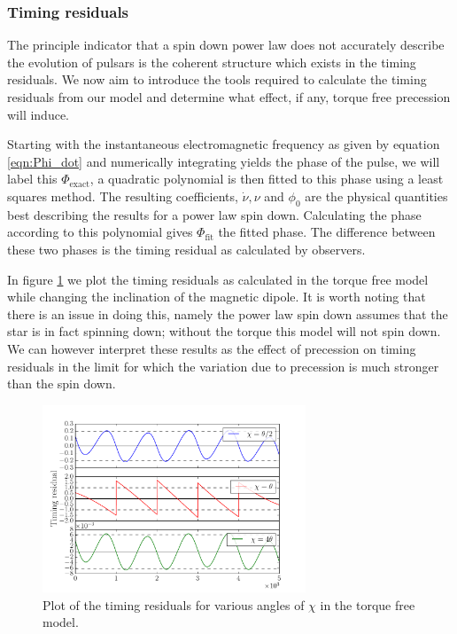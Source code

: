 \documentclass[11pt]{article}
\numberwithin{equation}{section}
\numberwithin{figure}{section}
\numberwithin{table}{section}
\begin{document}
\subsubsection{Timing residuals}
The principle indicator that a spin down power law does not accurately describe the evolution of pulsars is the coherent structure which exists in the timing residuals. We now aim to introduce the tools required to calculate the timing residuals from our model and determine what effect, if any, torque free precession will induce. 

Starting with the instantaneous electromagnetic frequency as given by equation \eqref{eqn:Phi_dot} %
and numerically integrating yields the phase of the pulse, we will label this $\Phi_{\textrm{exact}}$, a quadratic polynomial is then fitted to this phase using a least squares method. The resulting coefficients, $\dot{\nu}, \nu$ and $\phi_{0}$ are the physical quantities best describing the results for a power law spin down. Calculating the phase according to this polynomial gives $\Phi_{\textrm{fit}}$ the fitted phase. The difference between these two phases is the timing residual as calculated by observers. 

In figure \ref{fig:TR no torque} we plot the timing residuals as calculated in the torque free model while changing the inclination of the magnetic dipole. It is worth noting that there is an issue in doing this, namely the power law spin down assumes that the star is in fact spinning down; without the torque this model will not spin down. We can however interpret these results as the effect of precession on timing residuals in the limit for which the variation due to precession is much stronger than the spin down.%

\begin{figure}[ht]
\centering
	\includegraphics[width=0.7\textwidth]{Timing_residuals_no_torque.pdf}
\caption{Plot of the timing residuals for various angles of $\chi$ in the torque free model. }
\label{fig:TR no torque}
\end{figure}
\end{document}
